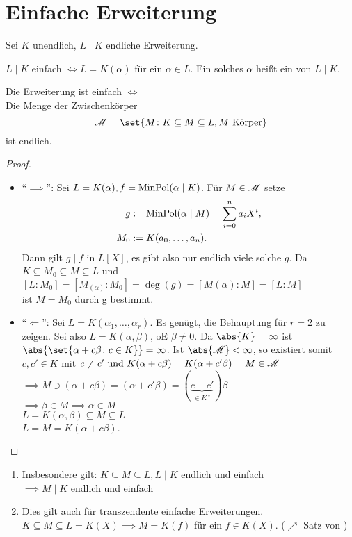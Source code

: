\section{Einfache Erweiterung}
Sei $K$ unendlich, $L \mid K$ endliche Erweiterung.
\begin{remark}
	$L \mid K$ einfach $\Longleftrightarrow L = K(\alpha)$ für ein $\alpha \in L$. Ein solches $\alpha$ heißt ein  von $L \mid K$.
\end{remark}
\begin{proposition}
	Die Erweiterung ist einfach $\Longleftrightarrow$ \\
	Die Menge der Zwischenkörper
	\[
		\Zwischen = \set{M \colon K \subseteq M \subseteq L, M \text{ Körper}}
	\]
	ist endlich.
\end{proposition}
\begin{proof}
	\begin{itemize}
		\item ``$\implies$'': Sei $L = K(\alpha), f= \operatorname{MinPol}(\alpha \mid K)$. Für $M \in \mathscr M$ setze
		\begin{align*}
			g&:= \operatorname{MinPol}(\alpha \mid M) = \sum_{i=0}^n a_i X^i,\\
			M_0 &:= K(a_0, \dots, a_n).
		\end{align*} 
		Dann gilt $g \mid f$ in $L[X]$, es gibt also nur endlich viele solche $g$. Da $K \subseteq M_0 \subseteq M \subseteq L$ und $[L:M_0] = [M_(\alpha):M_0]= \deg(g) = [M(\alpha):M] = [L:M]$\\
		ist $M = M_0$ durch g bestimmt.
		\item ``$\Longleftarrow$'': Sei $L = K(\alpha_1, \dots, \alpha_r)$. Es genügt, die Behauptung für $r = 2$ zu zeigen. Sei also $L = K(\alpha, \beta)$, oE $\beta \neq 0$. Da $\abs{K} = \infty$ ist $\abs{\set{\alpha + c\beta \colon c \in K}} = \infty$. Ist $\abs{\Zwischen} < \infty$, so existiert somit $c, c' \in K$ mit $c \neq c' \text{ und } K(\alpha + c \beta) = K(\alpha + c' \beta) = M \in \mathscr M$\\
		$\implies M \ni (\alpha + c \beta) = (\alpha + c' \beta) = (\underbrace{c-c'}_{\in K^{\times}})\beta$\\
		$\implies \beta \in M \implies \alpha \in M$\\
		$L = K(\alpha, \beta) \subseteq M \subseteq L$\\
		$L = M = K(\alpha + c\beta)$.
	\end{itemize}
\end{proof}
\begin{remark}
	\begin{enumerate}
		\item Insbesondere gilt:
		$K \subseteq M \subseteq L, L \mid K$ endlich und einfach\\
		$\implies M \mid K$ endlich und einfach
		\item Dies gilt auch für transzendente einfache Erweiterungen. $K \subseteq M \subseteq L = K(X) \implies M = K(f)$ für ein $f \in K(X)$. ($\nearrow$ Satz von )
	\end{enumerate}
\end{remark}
